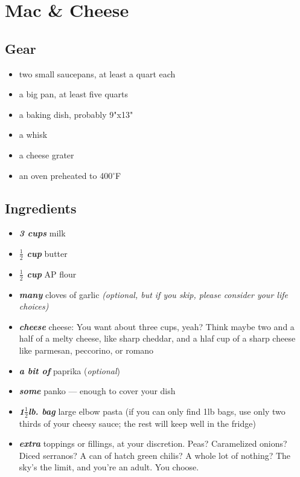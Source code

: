 \section{Mac \& Cheese}

\subsection*{Gear}

\begin{itemize}
  \item two small saucepans, at least a quart each
  \item a big pan, at least five quarts
  \item a baking dish, probably 9"x13"
  \item a whisk
  \item a cheese grater
  \item an oven preheated to 400$^{\circ}$F
\end{itemize}

\subsection*{Ingredients}

\begin{itemize}
  \item \textit{\textbf{3 cups}} milk
  \item \textit{\textbf{$\frac{1}{2}$ cup}} butter
  \item \textit{\textbf{$\frac{1}{2}$ cup}} AP flour
  \item \textit{\textbf{many}} cloves of garlic \textit{(optional, but if you skip, please consider your life choices)}
  \item \textit{\textbf{cheese}} cheese: You want about three cups, yeah? Think maybe two and a half of a melty cheese, like sharp cheddar, and a hlaf cup of a sharp cheese like parmesan, peccorino, or romano
  \item \textit{\textbf{a bit of}} paprika (\textit{optional})
  \item \textit{\textbf{some}} panko --- enough to cover your dish
  \item \textit{\textbf{1$\frac{1}{2}$lb. bag}} large elbow pasta (if you can only find 1lb bags, use only two thirds of your cheesy sauce; the rest will keep well in the fridge)
  \item \textit{\textbf{extra}} toppings or fillings, at your discretion. Peas? Caramelized onions? Diced serranos? A can of hatch green chilis? A whole lot of nothing? The sky's the limit, and you're an adult. You choose.
\end{itemize}


